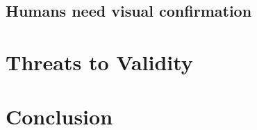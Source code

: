 \documentclass[acmsmall,screen,review,anonymous]{acmart}
\begin{document}
\subsection{Humans need visual confirmation}\label{sec:visual}



\section{Threats to Validity}\label{sec:threats}

\section{Conclusion}\label{sec:conclude}



\end{document}
